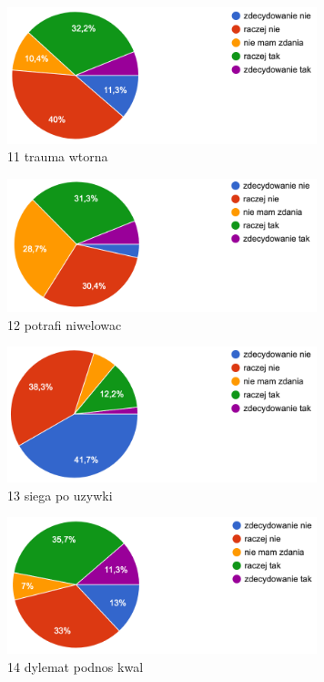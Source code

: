 \documentclass[a4paper,12pt,twoside,openany]{report}
\begin{document}
\begin{figure}
    \includegraphics[width=9cm]{wyniki/11_trauma_wtorna}
    \caption{ 11 trauma wtorna }
\end{figure}

\begin{figure}
    \includegraphics[width=9cm]{wyniki/12_potrafi_niwelowac}
    \caption{ 12 potrafi niwelowac }
\end{figure}

\begin{figure}
    \includegraphics[width=9cm]{wyniki/13_siega_po_uzywki}
    \caption{ 13 siega po uzywki }
\end{figure}

\begin{figure}
    \includegraphics[width=9cm]{wyniki/14_dylemat_podnos_kwal}
    \caption{ 14 dylemat podnos kwal }
\end{figure}
\end{document}
